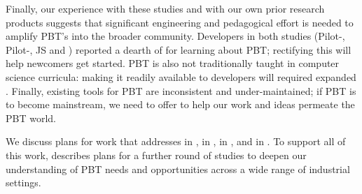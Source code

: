 Finally, our experience with these studies and with our own prior
research products suggests
that significant engineering and pedagogical effort is needed to amplify
PBT's  into the broader community.  Developers in both studies
(Pilot-, Pilot-, JS  and
) reported a dearth of  for
learning about PBT; rectifying this will help newcomers get started. PBT is also not traditionally
taught in computer science curricula: making it readily available to
developers will required expanded
. Finally, existing tools for PBT are
inconsistent and under-maintained; if PBT is to become mainstream, we
need to offer \iflater{}\fi{} to help our
work and ideas permeate the PBT world.

\iflater
{}
\fi

\iflater
{}%
%
We discuss plans for work that addresses  in ,  in
,
   in , and  in .  To support all of this work,
 describes plans for a further round of
studies to deepen our understanding of PBT needs and opportunities
across a wide range of industrial settings.
\fi

\iflater{}\fi


